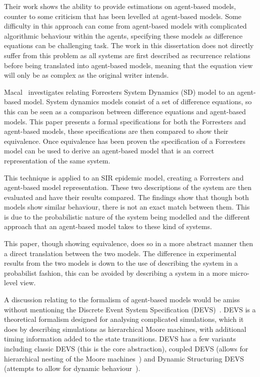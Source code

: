 \documentclass{article}
\begin{document}
Their work shows the ability to provide estimations on agent-based models, counter to some criticism that has been levelled at agent-based models. Some difficulty in this approach can come from agent-based models with complicated algorithmic behaviour within the agents, specifying these models as difference equations can be challenging task. The work in this dissertation does not directly suffer from this problem as all systems are first described as recurrence relations before being translated into agent-based models, meaning that the equation view will only be as complex as the original writer intends.  

Macal~\cite{abmtsd} investigates relating Forrester\textsc{}s System Dynamics (SD) model to an agent-based model. System dynamics models consist of a set of difference equations, so this can be seen as a comparison between difference equations and agent-based models. This paper presents a formal specifications for both the Forrester\textsc{}s and agent-based models, these specifications are then compared to show their equivalence. Once equivalence has been proven the specification of a Forrester\textsc{}s model can be used to derive an agent-based model that is an correct representation of the same system.

This technique is applied to an SIR epidemic model, creating a Forrester\textsc{}s and agent-based model representation. These two descriptions of the system are then evaluated and have their results compared. The findings show that though both models show similar behaviour, there is not an exact match between them. This is due to the probabilistic nature of the system being modelled and the different approach that an agent-based model takes to these kind of systems. 

This paper, though showing equivalence, does so in a more abstract manner then a direct translation between the two models. The difference in experimental results from the two models is down to the use of describing the system in a probabilist fashion, this can be avoided by describing a system in a more micro-level view.    

A discussion relating to the formalism of agent-based models would be amiss without mentioning the Discrete Event System Specification (DEVS)~\cite{introdevs}. DEVS is a theoretical formalism designed for analysing complicated simulations, which it does by describing simulations as hierarchical Moore machines, with additional timing information added to the state transitions. DEVS has a few variants including classic DEVS (this is the core abstraction), coupled DEVS (allows for hierarchical nesting of the Moore machines~\cite{coupleddevs}) and Dynamic Structuring DEVS (attempts to allow for dynamic behaviour~\cite{dynamicdevs}).
\end{document}
